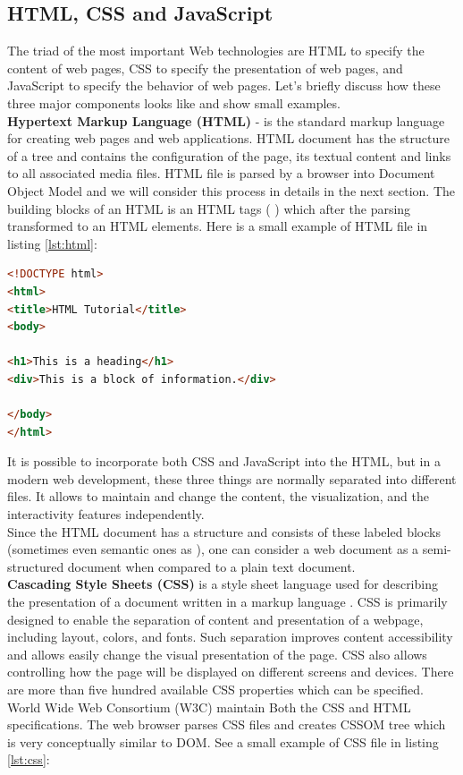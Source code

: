 \subsection{HTML, CSS and JavaScript}
The triad of the most important Web technologies are HTML to specify the content of web pages, CSS to specify the presentation of web pages, and JavaScript to specify the behavior of web pages.\cite{JSBook} Let's briefly discuss how these three major components looks like and show small examples.\\

\noindent\textbf{Hypertext Markup Language (HTML)} - is the standard markup language for creating web pages and web applications. HTML document has the structure of a tree and contains the configuration of the page, its textual content and links to all associated media files. HTML file is parsed by a browser into Document Object Model and we will consider this process in details in the next section. The building blocks of an HTML is an HTML tags ( )  which after the parsing transformed to an HTML elements. Here is a small example of HTML file in listing \ref{lst:html}: \\

\begin{lstlisting}[language=html, caption={Small example of HTML file}, label={lst:html}, captionpos=b]
<!DOCTYPE html>
<html>
<title>HTML Tutorial</title>
<body>

<h1>This is a heading</h1>
<div>This is a block of information.</div>

</body>
</html>
\end{lstlisting}

It is possible to incorporate both CSS and JavaScript into the HTML, but in a modern web development, these three things are normally separated into different files. It allows to maintain and change the content, the visualization, and the interactivity features independently.\\

Since the HTML document has a structure and consists of these labeled blocks (sometimes even semantic ones as ), one can consider a web document as a semi-structured document when compared to a plain text document.\\

\noindent\textbf{Cascading Style Sheets (CSS)} is a style sheet language used for describing the presentation of a document written in a markup language \cite{CSSMoz}. CSS is primarily designed to enable the separation of content and presentation of a webpage, including layout, colors, and fonts. Such separation improves content accessibility and allows easily change the visual presentation of the page. CSS also allows controlling how the page will be displayed on different screens and devices. There are more than five hundred available CSS properties which can be specified\cite{W3Schools}. World Wide Web Consortium (W3C) maintain Both the CSS and HTML specifications. The web browser parses CSS files and creates CSSOM tree which is very conceptually similar to DOM. See a small example of CSS file in listing \ref{lst:css}: \\

